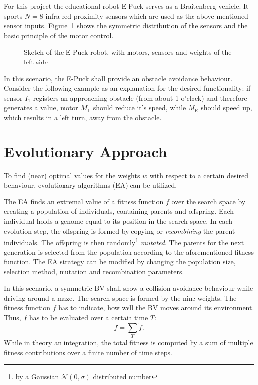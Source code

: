 \documentclass[a4paper]{article}
\begin{document}
For this project the educational robot E-Puck serves as a Braitenberg vehicle. It sports $N=8$ infra red proximity sensors which are used as the above mentioned sensor inputs. Figure~\ref{fig:epuck} shows the symmetric distribution of the sensors and the basic principle of the motor control.

\begin{figure}[hbt]
	\centering
	
	\caption{Sketch of the E-Puck robot, with motors, sensors and weights of the left side.}
	\label{fig:epuck}
\end{figure}

In this scenario, the E-Puck shall provide an obstacle avoidance behaviour. Consider the following example as an explanation for the desired functionality: if sensor $I_1$ registers an approaching obstacle (from about 1 o'clock) and therefore generates a value, motor $M_\mathrm{L}$ should reduce it's speed, while $M_\mathrm{R}$ should speed up, which results in a left turn, away from the obstacle.

\section{Evolutionary Approach}

To find (near) optimal values for the weights $w$ with respect to a certain desired behaviour, evolutionary algorithms (EA) can be utilized.

The EA finds an extremal value of a fitness function $f$ over the search space by creating a population of individuals, containing parents and offspring. Each individual holds a genome equal to its position in the search space. In each evolution step, the offspring is formed by copying or \emph{recombining} the parent individuals. The offspring is then randomly\footnote{by a Gaussian $\mathcal{N}(0,\sigma)$ distributed number} \emph{mutated}. The parents for the next generation is selected from the population according to the aforementioned fitness function. The EA strategy can be modified by changing the population size, selection method, mutation and recombination parameters.

In this scenario, a symmetric BV shall show a collision avoidance behaviour while driving around a maze. The search space is formed by the nine weights. The fitness function $f$ has to indicate, how well the BV moves around its environment. Thus, $f$ has to be evaluated over a certain time $T$:
\begin{equation}
	f = \sum\limits_T \tilde{f}.
\end{equation}
While in theory an integration, the total fitness is computed by a sum of multiple fitness contributions over a finite number of time steps. 
\end{document}
